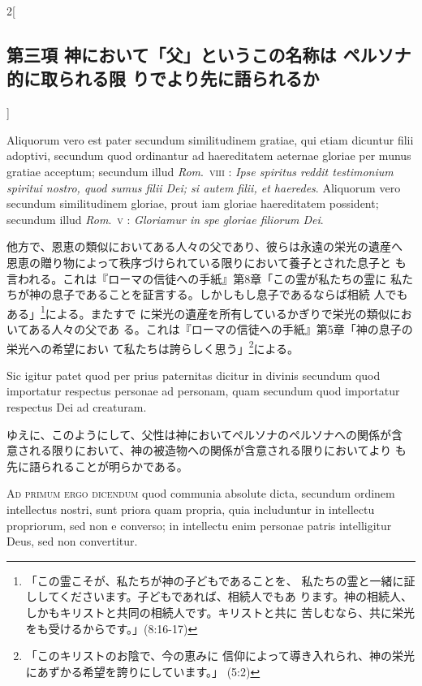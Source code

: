 \documentclass[paper=a4paper,fontsize=10pt,jafontsize=9pt,titlepage]{jlreq}
\begin{document}
\begin{paracol}{2}[\subsection{第三項 神において「父」というこの名称は ペルソナ的に取られる限 りでより先に語られるか}]
\switchcolumn*


Aliquorum vero est pater secundum similitudinem gratiae,
qui etiam dicuntur filii adoptivi, secundum quod ordinantur ad
haereditatem aeternae gloriae per munus gratiae acceptum; secundum
illud {\itshape Rom}.~{\scshape viii} : {\itshape Ipse spiritus reddit testimonium spiritui nostro,
quod sumus filii Dei; si autem filii, et haeredes}. Aliquorum vero
secundum similitudinem gloriae, prout iam gloriae haereditatem
possident; secundum illud {\itshape Rom}.~{\scshape v} : {\itshape Gloriamur in spe gloriae filiorum
Dei}.


\switchcolumn


他方で、恩恵の類似においてある人々の父であり、彼らは永遠の栄光の遺産へ
 恩恵の贈り物によって秩序づけられている限りにおいて養子とされた息子と
も言われる。これは『ローマの信徒への手紙』第8章「この霊が私たちの霊に
 私たちが神の息子であることを証言する。しかしもし息子であるならば相続
 人でもある」\footnote{「この霊こそが、私たちが神の子どもであることを、
 私たちの霊と一緒に証ししてくださいます。子どもであれば、相続人でもあ
 ります。神の相続人、しかもキリストと共同の相続人です。キリストと共に
 苦しむなら、共に栄光をも受けるからです。」(8:16-17) }による。またすで
 に栄光の遺産を所有しているかぎりで栄光の類似においてある人々の父であ
 る。これは『ローマの信徒への手紙』第5章「神の息子の栄光への希望におい
 て私たちは誇らしく思う」\footnote{「このキリストのお陰で、今の恵みに
 信仰によって導き入れられ、神の栄光にあずかる希望を誇りにしています。」
 (5:2)}による。


\switchcolumn*


Sic igitur patet quod per prius paternitas dicitur in divinis
secundum quod importatur respectus personae ad personam, quam secundum
quod importatur respectus Dei ad creaturam.


\switchcolumn


ゆえに、このようにして、父性は神においてペルソナのペルソナへの関係が含
 意される限りにおいて、神の被造物への関係が含意される限りにおいてより
 も先に語られることが明らかである。


\switchcolumn*[\subsection{ad.1}]


{\scshape Ad primum ergo dicendum} quod communia absolute dicta, secundum ordinem
intellectus nostri, sunt priora quam propria, quia includuntur in
intellectu propriorum, sed non e converso; in intellectu enim personae
patris intelligitur Deus, sed non convertitur.



\end{paracol}
\end{document}
